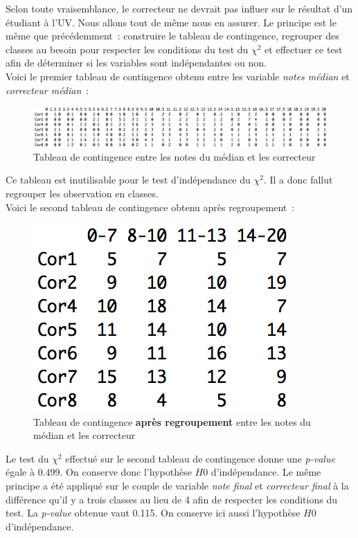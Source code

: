 \documentclass[a4paper,11pt]{report}
\begin{document}
Selon toute vraisemblance, le correcteur ne devrait pas influer sur le résultat d'un étudiant à l'UV. Nous allons tout de même nous en assurer. Le principe est le même que précédemment~: construire le tableau de contingence, regrouper des classes au besoin pour respecter les conditions du test du $\chi^2$ et effectuer ce test afin de déterminer si les variables sont indépendantes ou non.
\\
Voici le premier tableau de contingence obtenu entre les variable \textit{notes médian} et \textit{correcteur médian}~:

\begin{figure}[H]
	\centering
	\captionsetup{justification=centering, margin=2cm}
	\includegraphics[width=.9\linewidth]{img/1-1-2-Contingence-Result-Correcteur-Median-Origine}
	\caption{\scriptsize Tableau de contingence entre les notes du médian et les correcteur}
	\label{fig:contingence_resultats_correcteur}
\end{figure}

Ce tableau est inutilisable pour le test d'indépendance du $\chi^2$. Il a donc fallut regrouper les observation en classes.\\
Voici le second tableau de contingence obtenu après regroupement~:
\begin{figure}[H]
	\centering
	\captionsetup{justification=centering, margin=4cm}
	\includegraphics[width=.2\linewidth]{img/1-1-2-Contingence-Result-Correcteur-Median-Corrige}
	\caption{\scriptsize Tableau de contingence \textbf{après regroupement} entre les notes du médian et les correcteur}
	\label{fig:contingence_resultats_correcteur_corrige}
\end{figure}

Le test du $\chi^2$ effectué sur le second tableau de contingence donne une \textit{p-value} égale à 0.499. On conserve donc l'hypothèse $H{0}$ d'indépendance. Le même principe a été appliqué sur le couple de variable \textit{note final} et \textit{correcteur final} à la différence qu'il y a trois classes au lieu de 4 afin de respecter les conditions du test. La \textit{p-value} obtenue vaut 0.115. On conserve ici aussi l'hypothèse $H{0}$ d'indépendance.
\end{document}
